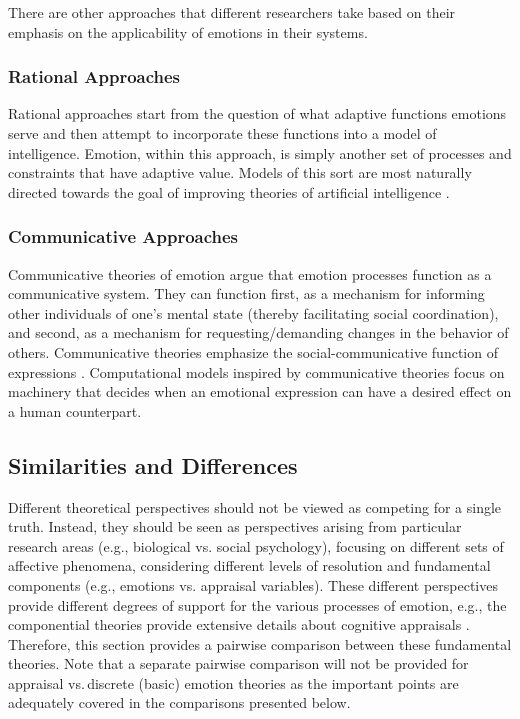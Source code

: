 \documentclass[12pt]{report}
\begin{document}
There are other approaches that different researchers take based on their
emphasis on the applicability of emotions in their systems.

\subsubsection{Rational Approaches}

Rational approaches start from the question of what adaptive functions emotions
serve and then attempt to incorporate these functions into a model of
intelligence. Emotion, within this approach, is simply another set of processes
and constraints that have adaptive value. Models of this sort are most naturally
directed towards the goal of improving theories of artificial intelligence
\cite{anderson:newell-cognition} \cite{scheutz:affect-agent}
\cite{simon:motivation-emotion-cognition}.

\subsubsection{Communicative Approaches}

Communicative theories of emotion argue that emotion processes function as a
communicative system. They can function first, as a mechanism for informing
other individuals of one's mental state (thereby facilitating social
coordination), and second, as a mechanism for requesting/demanding changes in
the behavior of others. Communicative theories emphasize the
social-communicative function of expressions \cite{gratch:emotion-intention}.
Computational models inspired by communicative theories focus on machinery that
decides when an emotional expression can have a desired effect on a human
counterpart.

\subsection{Similarities and Differences}
\label{sec:comparison}

Different theoretical perspectives should not be viewed as competing for a
single truth. Instead, they should be seen as perspectives arising from
particular research areas (e.g., biological vs. social psychology), focusing on
different sets of affective phenomena, considering different levels of
resolution and fundamental components (e.g., emotions vs. appraisal variables).
These different perspectives provide different degrees of support for the
various processes of emotion, e.g., the componential theories provide extensive
details about cognitive appraisals \cite{hudlicka:guidelines-emotions}.
Therefore, this section provides a pairwise comparison between these fundamental
theories. Note that a separate pairwise comparison will not be provided for
appraisal vs.\,discrete (basic) emotion theories as the important points are
adequately covered in the comparisons presented below.
\end{document}
